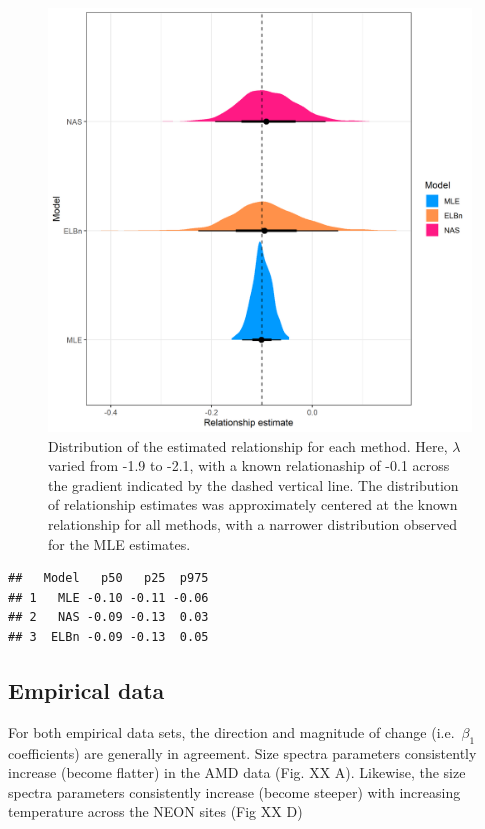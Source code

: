 \documentclass[
]{article}
\begin{document}
\begin{figure}
\centering
\includegraphics{figures/PLB_sim_small_relationship_density.png}
\caption{Distribution of the estimated relationship for each method.
Here, \(\lambda\) varied from -1.9 to -2.1, with a known relationaship
of -0.1 across the gradient indicated by the dashed vertical line. The
distribution of relationship estimates was approximately centered at the
known relationship for all methods, with a narrower distribution
observed for the MLE estimates.}
\end{figure}

\begin{verbatim}
##   Model   p50   p25  p975
## 1   MLE -0.10 -0.11 -0.06
## 2   NAS -0.09 -0.13  0.03
## 3  ELBn -0.09 -0.13  0.05
\end{verbatim}

\hypertarget{empirical-data-1}{%
\subsection{Empirical data}\label{empirical-data-1}}

For both empirical data sets, the direction and magnitude of change
(i.e.~\(\beta_1\) coefficients) are generally in agreement. Size spectra
parameters consistently increase (become flatter) in the AMD data (Fig.
XX A). Likewise, the size spectra parameters consistently increase
(become steeper) with increasing temperature across the NEON sites (Fig
XX D)
\end{document}
